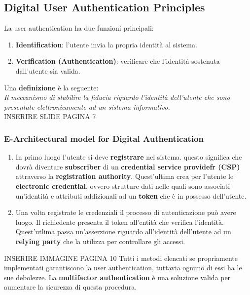 \documentclass[12pt]{article}
\begin{document}
	\subsection{Digital User Authentication Principles}
		La user authentication ha due funzioni principali:
		\begin{enumerate}
			\item \textbf{Identification}: l'utente invia la propria identità al sistema.
			\item \textbf{Verification (Authentication)}: verificare che l'identità sostenuta dall'utente sia valida.
		\end{enumerate}
	Una \textbf{definizione} è la seguente:\\
	\textit{Il meccanismo di stabilire la fiducia riguardo l'identità dell'utente che sono presentate elettronicamente ad un sistema informativo. }\\
	INSERIRE SLIDE PAGINA 7\\
		\subsubsection{E-Architectural model for Digital Authentication}
			\begin{enumerate}
				\item In primo luogo l'utente si deve \textbf{registrare} nel sistema. questo significa che dovrà diventare \textbf{subscriber} di un \textbf{credential service providefr (CSP)} attraverso la \textbf{registration authority}. Quest'ultima crea per l'utente le \textbf{electronic credential}, ovvero strutture dati nelle quali sono associati un'identità e attributi addizionali ad un \textbf{token} che è in possesso dell'utente.
				\item Una volta registrate le credenziali il processo di autenticazione può avere luogo. Il  richiedente presenta il token all'entità che verifica l'identità. Quest'utlima passa un'asserzione riguardo all'identità dell'utente ad un \textbf{relying party} che la utilizza per controllare gli accessi.
			\end{enumerate}
			INSERIRE IMMAGINE PAGINA 10
			Tutti i metodi elencati se propriamente implementati garantiscono la user authentication, tuttavia ognuno di essi ha le sue debolezze. La \textbf{multifactor authentication} è una soluzione valida per aumentare la sicurezza di questa procedura.
\end{document}
